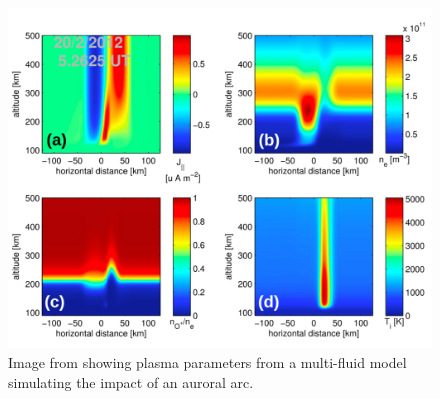 \begin{figure}[!t]
\centering
\includegraphics[width=5.0in]{MZsim}
\caption{Image from \cite{Perry:2015jf} showing plasma parameters from a multi-fluid model\cite{semeter:plasmatransport2012} simulating the impact of an auroral arc. }
\label{fig:mzsim}
\end{figure}
